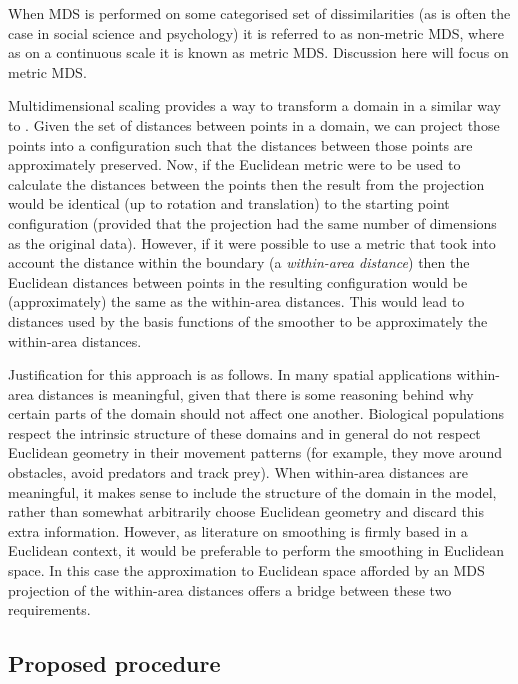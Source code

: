 When MDS is performed on some categorised set of dissimilarities (as is often the case in social science and psychology) it is referred to as non-metric MDS, where as on a continuous scale it is known as metric MDS. Discussion here will focus on metric MDS.

Multidimensional scaling provides a way to transform a domain in a similar way to \sch. Given the set of distances between points in a domain, we can project those points into a configuration such that the distances between those points are approximately preserved. Now, if the Euclidean metric were to be used to calculate the distances between the points then the result from the projection would be identical (up to rotation and translation) to the starting point configuration (provided that the projection had the same number of dimensions as the original data). However, if it were possible to use a metric that took into account the distance within the boundary (a \textit{within-area distance}) then the Euclidean distances between points in the resulting configuration would be (approximately) the same as the within-area distances. This would lead to distances used by the basis functions of the smoother to be approximately the within-area distances.

Justification for this approach is as follows. In many spatial applications within-area distances is meaningful, given that there is some reasoning behind why certain parts of the domain should not affect one another. Biological populations respect the intrinsic structure of these domains and in general do not respect Euclidean geometry in their movement patterns (for example, they move around obstacles, avoid predators and track prey). When within-area distances are meaningful, it makes sense to include the structure of the domain in the model, rather than somewhat arbitrarily choose Euclidean geometry and discard this extra information. However, as literature on smoothing is firmly based in a Euclidean context, it would be preferable to perform the smoothing in Euclidean space. In this case the approximation to Euclidean space afforded by an MDS projection of the within-area distances offers a bridge between these two requirements.

\subsection{Proposed procedure}
\label{mdsproc}

